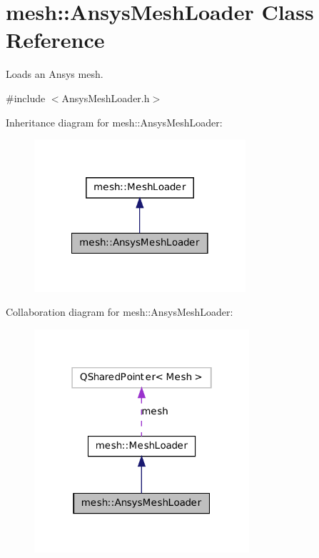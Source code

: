 \hypertarget{classmesh_1_1_ansys_mesh_loader}{
\section{mesh::AnsysMeshLoader Class Reference}
\label{classmesh_1_1_ansys_mesh_loader}
}


Loads an Ansys mesh.  




{\ttfamily \#include $<$AnsysMeshLoader.h$>$}



Inheritance diagram for mesh::AnsysMeshLoader:\nopagebreak
\begin{figure}[H]
\begin{center}
\leavevmode
\includegraphics[width=222pt]{classmesh_1_1_ansys_mesh_loader__inherit__graph}
\end{center}
\end{figure}


Collaboration diagram for mesh::AnsysMeshLoader:\nopagebreak
\begin{figure}[H]
\begin{center}
\leavevmode
\includegraphics[width=226pt]{classmesh_1_1_ansys_mesh_loader__coll__graph}
\end{center}
\end{figure}
